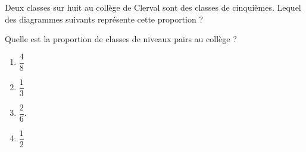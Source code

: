 
\begin{exercice}\label{exosmath-0857}

    Deux classes sur huit au collège de Clerval sont des classes de cinquièmes. Lequel des diagrammes suivants représente cette proportion ?

\begin{center}
   
   
   
\end{center}
Quelle est la proportion de classes de niveaux pairs au collège ?
\begin{multicols}{2}
    \begin{enumerate}
        \item
            \( \dfrac{ 4 }{ 8 }\)
        \item
            \( \dfrac{ 1 }{ 3 }\)
        \item
            \( \dfrac{ 2 }{ 6 }\).
        \item
            \( \dfrac{ 1 }{ 2 }\)
    \end{enumerate}
\end{multicols}

\end{exercice}
